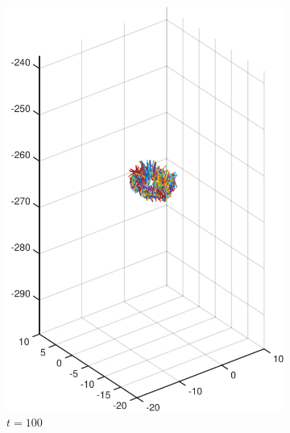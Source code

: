\documentclass[a4paper,11pt]{kth-mag}
\begin{document}
\begin{figure}
\begin{subfigure}[h]{0.4\textwidth}
    \includegraphics[width=\textwidth]{img/sphere_00100.pdf}
    \caption{$t=100$}\label{fig:sphere_simulation_1b}
  \end{subfigure}
  \begin{subfigure}[h]{0.4\textwidth}
    \centering

\end{subfigure}
\end{figure}
\end{document}
